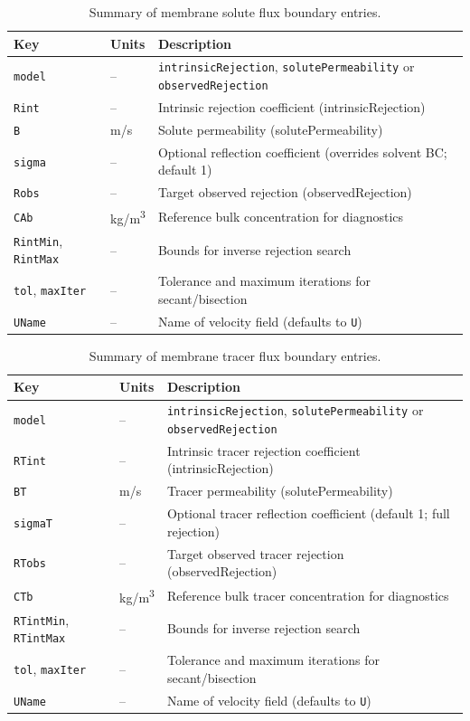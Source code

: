 \documentclass[11pt,a4paper]{article}
\begin{document}
\begin{table}[h]
  \centering
  \caption{Summary of membrane solute flux boundary entries.}
  \label{tab:membrane-solute}
  \begin{tabular}{@{}llp{8cm}@{}}
    \toprule
    Key & Units & Description\\
    \midrule
    \texttt{model} & – & \texttt{intrinsicRejection}, \texttt{solutePermeability} or \texttt{observedRejection}\\
    \texttt{Rint} & – & Intrinsic rejection coefficient (intrinsicRejection)\\
    \texttt{B} & \si{m/s} & Solute permeability (solutePermeability)\\
    \texttt{sigma} & – & Optional reflection coefficient (overrides solvent BC; default 1)\\
    \texttt{Robs} & – & Target observed rejection (observedRejection)\\
    \texttt{CAb} & \si{kg/m^3} & Reference bulk concentration for diagnostics\\
    \texttt{RintMin}, \texttt{RintMax} & – & Bounds for inverse rejection search\\
    \texttt{tol}, \texttt{maxIter} & – & Tolerance and maximum iterations for secant/bisection\\
    \texttt{UName} & – & Name of velocity field (defaults to \texttt{U})\\
    \bottomrule
  \end{tabular}
\end{table}

\begin{table}[h]
  \centering
  \caption{Summary of membrane tracer flux boundary entries.}
  \label{tab:membrane-tracer}
  \begin{tabular}{@{}llp{8cm}@{}}
    \toprule
    Key & Units & Description\\
    \midrule
    \texttt{model} & -- & \texttt{intrinsicRejection}, \texttt{solutePermeability} or \texttt{observedRejection}\\
    \texttt{RTint} & -- & Intrinsic tracer rejection coefficient (intrinsicRejection)\\
    \texttt{BT} & \si{m/s} & Tracer permeability (solutePermeability)\\
    \texttt{sigmaT} & -- & Optional tracer reflection coefficient (default 1; full rejection)\\
    \texttt{RTobs} & -- & Target observed tracer rejection (observedRejection)\\
    \texttt{CTb} & \si{kg/m^3} & Reference bulk tracer concentration for diagnostics\\
    \texttt{RTintMin}, \texttt{RTintMax} & -- & Bounds for inverse rejection search\\
    \texttt{tol}, \texttt{maxIter} & -- & Tolerance and maximum iterations for secant/bisection\\
    \texttt{UName} & -- & Name of velocity field (defaults to \texttt{U})\\
    \bottomrule
  \end{tabular}
\end{table}
\end{document}
